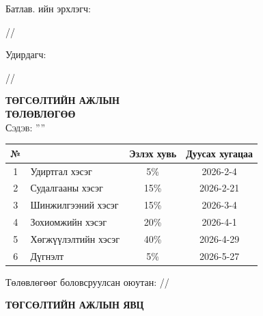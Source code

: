 \begin{titlepage}

\vspace*{0.5cm}
Батлав. \deptname ийн эрхлэгч: 
\begin{flushright}
\makebox[4cm]{\dotfill} /\chairname/ 
\end{flushright}

Удирдагч: 
\begin{flushright}
\makebox[4cm]{\dotfill} /\supname/
\end{flushright}

\begin{center}

\vspace*{2cm}
\textbf{{\large ТӨГСӨЛТИЙН АЖЛЫН \\ ТӨЛӨВЛӨГӨӨ}}\\[0.5cm]

\textsc{\large Сэдэв: ''\ttitle''}\\[0.5cm]

\begin{tabular}{|c|p{7cm}|c|c|}
	\hline
	№ & \makebox[7cm][c]{Ажлын бүлэг, хэсгийн нэр} & Эзлэх хувь & Дуусах хугацаа \\ \hline
	1 & {Удиртгал хэсэг}         &  5\% & 2026-2-4 \\ \hline
	2 & {Судалгааны хэсэг}     & 15\% & 2026-2-21 \\ \hline
	3 & {Шинжилгээний хэсэг} & 15\% & 2026-3-4 \\ \hline
	4 & {Зохиомжийн хэсэг}    & 20\% & 2026-4-1 \\ \hline
	5 & {Хөгжүүлэлтийн хэсэг}  & 40\% & 2026-4-29 \\ \hline
        6 & {Дүгнэлт}          & 5\% & 2026-5-27 \\ \hline
\end{tabular}

\vspace{2cm}
Төлөвлөгөөг боловсруулсан оюутан: \makebox[3cm]{\dotfill} /\shortname/

\end{center}

\newpage

\begin{center}

\vspace*{2cm}
\textbf{{\large ТӨГСӨЛТИЙН АЖЛЫН ЯВЦ}}\\[0.5cm]


\end{center}
\end{titlepage}
